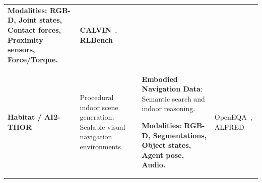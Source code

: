 \documentclass[acmsmall,screen,review]{acmart}
\begin{document}
\begin{table}[!t]
{\begin{tabular}{@{}l >{\raggedright\arraybackslash}p{4.2cm} >{\raggedright\arraybackslash}p{5.8cm} >{\raggedright\arraybackslash}p{5.5cm}@{}}
\textbf{Modalities: RGB-D, Joint states, Contact forces, Proximity sensors, Force/Torque.} & \textbf{CALVIN}~\cite{mees2022calvin}, \textbf{RLBench}~\cite{james2020rlbench} \\

\textbf{Habitat / AI2-THOR} & Procedural indoor scene generation; Scalable visual navigation environments. & \textbf{Embodied Navigation Data}: Semantic search and indoor reasoning. 

\textbf{Modalities: RGB-D, Segmentations, Object states, Agent pose, Audio.} & OpenEQA~\cite{majumdar2024openeqa}, ALFRED~\cite{shridhar2020alfred} \\

\bottomrule
\end{tabular}}
\end{table}
\end{document}
